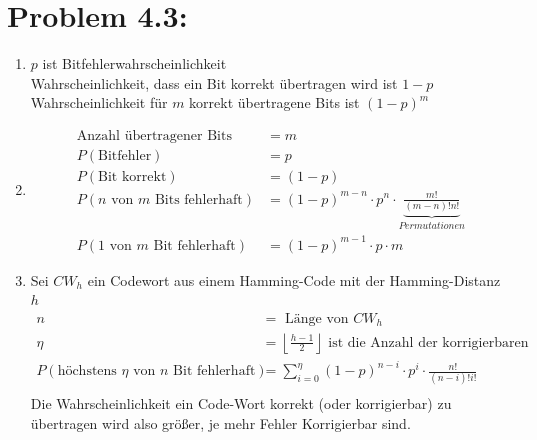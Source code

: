 \documentclass[10pt,a4paper]{article}
\begin{document}
\section*{Problem 4.3:}
\begin{enumerate}
	\item$p$ ist Bitfehlerwahrscheinlichkeit\\
		Wahrscheinlichkeit, dass ein Bit korrekt übertragen wird ist $1-p$\\
		Wahrscheinlichkeit für $m$ korrekt übertragene Bits ist $(1-p)^m$
	\item
		\begin{align*}
			\text{Anzahl übertragener Bits} &= m\\
			P(\text{Bitfehler}) &= p\\
			P(\text{Bit korrekt}) &= (1-p)\\
			P(n \text{ von } m \text{ Bits fehlerhaft}) &= (1 - p)^{m-n} \cdot p^n \cdot \underbrace{\frac{m!}{(m-n)!n!}}_{Permutationen} \\
			P(1\text{ von } m \text{ Bit fehlerhaft}) &= (1-p)^{m-1} \cdot p \cdot m
		\end{align*}
	\item
		Sei $CW_h$ ein Codewort aus einem Hamming-Code mit der Hamming-Distanz $h$\\		
		\begin{align*}	
			n &= \text{ Länge von }CW_h \\
			\eta &= \left\lfloor \frac{h-1}{2} \right\rfloor \text{ ist die Anzahl der korrigierbaren Fehler.} \\
			P(\text{höchstens } \eta \text{ von } n \text{ Bit fehlerhaft}) 
				&= \sum_{i=0}^{\eta}{(1 - p)^{n-i} \cdot p^i} \cdot \frac{n!}{(n-i)!i!}\\
		\end{align*}
		Die Wahrscheinlichkeit ein Code-Wort korrekt (oder korrigierbar) zu übertragen wird also größer, je mehr Fehler Korrigierbar sind.	
\end{enumerate}
\end{document}
